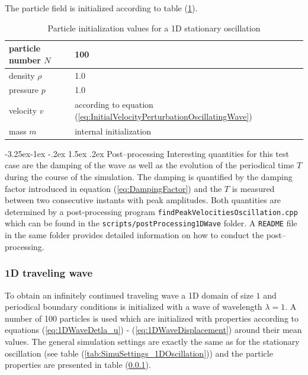 \documentclass[11pt,a4paper,twoside]{report}
\makeatletter
\renewcommand\paragraph{\@startsection{paragraph}{4}{\z@}%
  {-3.25ex\@plus -1ex \@minus -.2ex}%
  {1.5ex \@plus .2ex}%
  {\normalfont\normalsize\bfseries}}
\makeatother
\begin{document}
The particle field is initialized according to table (\ref{tab:InitPartValues_1DOscillation}).

\begin{table}[h] %
\label{tab:InitPartValues_1DOscillation}
\centering

\begin{tabular}[c]{|l|p{5cm}|} %
\hline
\hline
particle number $N$ &  100\\
\hline
density $\rho$ &  1.0\\
\hline
pressure $p$ &  1.0\\
\hline
velocity $v$ & according to equation (\ref{eq:InitialVelocityPerturbationOscillatingWave})\\
\hline
mass $m$ & internal initialization\\
\hline
\hline
\end{tabular}
\caption[]{Particle initialization values for a 1D stationary oscillation}

\end{table}
\paragraph{Post--processing}
Interesting quantities for this test case are the damping of the wave as well as the evolution of the periodical time $T$ during the course of the simulation. The damping is quantified by the damping factor introduced in equation (\ref{eq:DampingFactor}) and the $T$ is measured between two consecutive instants with peak amplitudes. Both quantities are determined by a post-processing program {\tt findPeakVelocitiesOscillation.cpp} which can be found in the {\tt scripts/postProcessing1DWave} folder. A {\tt README} file in the same folder provides detailed information on how to conduct the post--processing.

\subsubsection{1D traveling wave}
To obtain an infinitely continued traveling wave a 1D domain of size $1$ and periodical boundary conditions is initialized with a wave of wavelength $\lambda=1$. A number of 100 particles is used which are initialized with properties according to equations (\ref{eq:1DWaveDetla_u}) - (\ref{eq:1DWaveDisplacement}) around their mean values.
The general simulation settings are exactly the same as for the stationary oscillation (see table (\ref{tab:SimuSettings_1DOscillation})) and the particle properties are presented in table (\ref{}).
\end{document}
